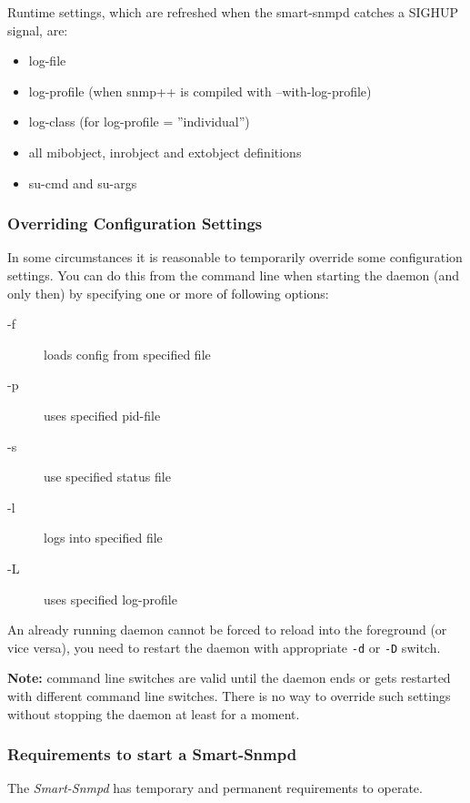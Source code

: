 Runtime settings, which are refreshed when the smart-snmpd catches a
SIGHUP signal, are:

\begin{itemize}
\item{log-file}
\item{log-profile (when snmp++ is compiled with --with-log-profile)}
\item{log-class (for log-profile = ''individual'')}
\item{all mibobject, inrobject and extobject definitions}
\item{su-cmd and su-args}
\end{itemize}

\subsubsection{Overriding Configuration Settings}

In some circumstances it is reasonable to temporarily override some
configuration settings. You can do this from the command line when
starting the daemon (and only then) by specifying one or more of following
options:

\begin{description}
\item[-f]{loads config from specified file}
\item[-p]{uses specified pid-file}
\item[-s]{use specified status file}
\item[-l]{logs into specified file}
\item[-L]{uses specified log-profile}
\end{description}

An already running daemon cannot be forced to reload into the foreground (or
vice versa), you need to restart the daemon with appropriate \texttt{-d}
or \texttt{-D} switch.

\textbf{Note:} command line switches are valid until the daemon
ends or gets restarted with different command line switches. There is no
way to override such settings without stopping the daemon at least for a
moment.

\subsubsection{Requirements to start a Smart-Snmpd}

The \emph{Smart-Snmpd} has temporary and permanent requirements to operate.


